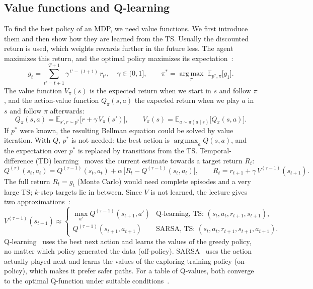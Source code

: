 \documentclass[11pt]{article}
\begin{document}
\subsection{Value functions and Q-learning}
\label{sec:bg-value}
 
To find the best policy of an MDP, we need value functions. We first introduce them and
then show how they are learned from the TS. Usually the discounted return is used, which
weights rewards further in the future less. The agent maximizes this return, and the
optimal policy maximizes its expectation~\cite{koethe2026mle,sutton2018}:
\begin{equation}
  g_t = \sum_{t'=t+1}^{T+1} \gamma^{\,t'-(t+1)}\, r_{t'}, \quad \gamma \in (0,1],
  \qquad
  \pi^* = \operatorname*{arg\,max}_{\pi}\; \mathbb{E}_{p^*,\pi}\bigl[g_1\bigr].
\end{equation}
The value function $V_\pi(s)$ is the expected return when we start in $s$ and follow
$\pi$, and the action-value function $Q_\pi(s,a)$ the expected return when we play $a$ in
$s$ and follow $\pi$ afterwards:
\begin{equation}
  Q_\pi(s,a) = \mathbb{E}_{s',r\sim p^*}\bigl[r + \gamma\, V_\pi(s')\bigr],
  \qquad
  V_\pi(s) = \mathbb{E}_{a\sim\pi(a\mid s)}\bigl[Q_\pi(s,a)\bigr].
\end{equation}
If $p^*$ were known, the resulting Bellman equation could be solved by value iteration.
With $Q$, $p^*$ is not needed: the best action is $\operatorname*{arg\,max}_a Q(s,a)$,
and the expectation over $p^*$ is replaced by transitions from the TS.
Temporal-difference (TD) learning~\cite{sutton1988} moves the current estimate towards a
target return $R_t$:
\begin{equation}
  \label{eq:td}
  Q^{(\tau)}(s_t,a_t) = Q^{(\tau-1)}(s_t,a_t)
      + \alpha\,\bigl[R_t - Q^{(\tau-1)}(s_t,a_t)\bigr],
  \qquad
  R_t = r_{t+1} + \gamma\, V^{(\tau-1)}(s_{t+1}).
\end{equation}
The full return $R_t = g_t$ (Monte Carlo) would need complete episodes and a very large
TS; $k$-step targets lie in between. Since $V$ is not learned, the lecture gives two
approximations~\cite{koethe2026mle}:
\begin{equation}
  \label{eq:qtarget}
  V^{(\tau-1)}(s_{t+1}) \approx
  \begin{cases}
    \max_{a'} Q^{(\tau-1)}(s_{t+1},a') & \text{Q-learning, TS: } (s_t,a_t,r_{t+1},s_{t+1}),\\[2pt]
    Q^{(\tau-1)}(s_{t+1},a_{t+1}) & \text{SARSA, TS: } (s_t,a_t,r_{t+1},s_{t+1},a_{t+1}).
  \end{cases}
\end{equation}
Q-learning~\cite{watkins1992} uses the best next action and learns the values of the
greedy policy, no matter which policy generated the data (off-policy).
SARSA~\cite{rummery1994} uses the action actually played next and learns the values of
the exploring training policy (on-policy), which makes it prefer safer paths. For a table of Q-values, both converge to
the optimal Q-function under suitable conditions~\cite{watkins1992,singh2000}.
 
\end{document}
